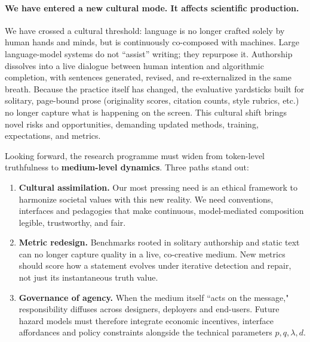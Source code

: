 \documentclass[12pt]{article}
\theoremstyle{definition}
\begin{document}
\paragraph{We have entered a new cultural mode. It affects scientific production.} 
We have crossed a cultural threshold: language is no longer crafted solely by human hands and minds, but is continuously co-composed with machines.  Large language-model systems do not ``assist'' writing; they repurpose it.  Authorship dissolves into a live dialogue between human intention and algorithmic completion, with sentences generated, revised, and re-externalized in the same breath.  Because the practice itself has changed, the evaluative yardsticks built for solitary, page-bound prose (originality scores, citation counts, style rubrics, etc.) no longer capture what is happening on the screen.  This cultural shift brings novel risks and opportunities, demanding updated methods, training, expectations, and metrics.

Looking forward, the research programme must widen from
token-level truthfulness to \textbf{medium-level dynamics}.  Three paths
stand out:

\begin{enumerate}
    \item \textbf{Cultural assimilation.}  Our most pressing need is  an ethical framework to harmonize societal values with this new reality.  We need conventions,
          interfaces and pedagogies that make continuous, model-mediated
          composition legible, trustworthy, and fair. 
    \item \textbf{Metric redesign.}  Benchmarks rooted in solitary
          authorship and static text can no longer capture quality in a
          live, co-creative medium.  New metrics should score how a
          statement evolves under iterative detection and repair, not
          just its instantaneous truth value.
    \item \textbf{Governance of agency.}  When the medium itself
          ``acts on the message," responsibility diffuses across
          designers, deployers and end-users.  Future hazard models
          must therefore integrate economic incentives, interface
          affordances and policy constraints alongside the technical
          parameters \(p,q,\lambda,d\).
\end{enumerate}
\end{document}
